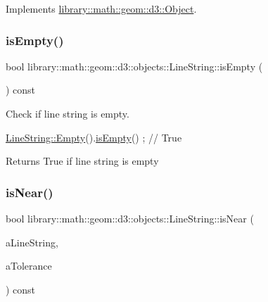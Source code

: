 Implements \hyperlink{classlibrary_1_1math_1_1geom_1_1d3_1_1_object_a2216442e322f0c3ca5f01a4efa22baf7}{library\+::math\+::geom\+::d3\+::\+Object}.

\mbox{\label{classlibrary_1_1math_1_1geom_1_1d3_1_1objects_1_1_line_string_a33e1e2dfcd7352eb41b6991bd97ec6cd}} 
\subsubsection{\texorpdfstring{is\+Empty()}{isEmpty()}}
{\footnotesize\ttfamily bool library\+::math\+::geom\+::d3\+::objects\+::\+Line\+String\+::is\+Empty (\begin{DoxyParamCaption}{ }\end{DoxyParamCaption}) const}



Check if line string is empty. 


\begin{DoxyCode}
\hyperlink{classlibrary_1_1math_1_1geom_1_1d3_1_1objects_1_1_line_string_ae9e05ddb3ab59060c78d18e19624f307}{LineString::Empty}().\hyperlink{classlibrary_1_1math_1_1geom_1_1d3_1_1objects_1_1_line_string_a33e1e2dfcd7352eb41b6991bd97ec6cd}{isEmpty}() ; \textcolor{comment}{// True}
\end{DoxyCode}


\begin{DoxyReturn}{Returns}
True if line string is empty 
\end{DoxyReturn}
\mbox{\label{classlibrary_1_1math_1_1geom_1_1d3_1_1objects_1_1_line_string_acbfb3f1c542793b9fa810ba8626633c4}} 
\subsubsection{\texorpdfstring{is\+Near()}{isNear()}}
{\footnotesize\ttfamily bool library\+::math\+::geom\+::d3\+::objects\+::\+Line\+String\+::is\+Near (\begin{DoxyParamCaption}\item[{const \hyperlink{classlibrary_1_1math_1_1geom_1_1d3_1_1objects_1_1_line_string}{Line\+String} \&}]{a\+Line\+String,  }\item[{const Real \&}]{a\+Tolerance }\end{DoxyParamCaption}) const}



